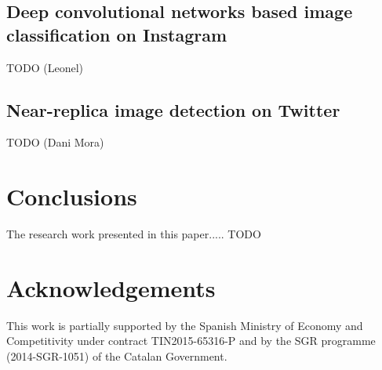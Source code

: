 \documentclass[journal]{IEEEtran}
\begin{document}
\subsection{Deep convolutional networks based image classification on Instagram}

TODO (Leonel)

\subsection{Near-replica image detection on Twitter}

TODO (Dani Mora)


%
\section{Conclusions}
%
The research work presented in this paper..... TODO

\section*{Acknowledgements}
This work is partially supported by the Spanish Ministry of Economy and Competitivity under contract TIN2015-65316-P and by the SGR programme (2014-SGR-1051) of the Catalan Government.

\begin{small}


\end{small}


\end{document}
